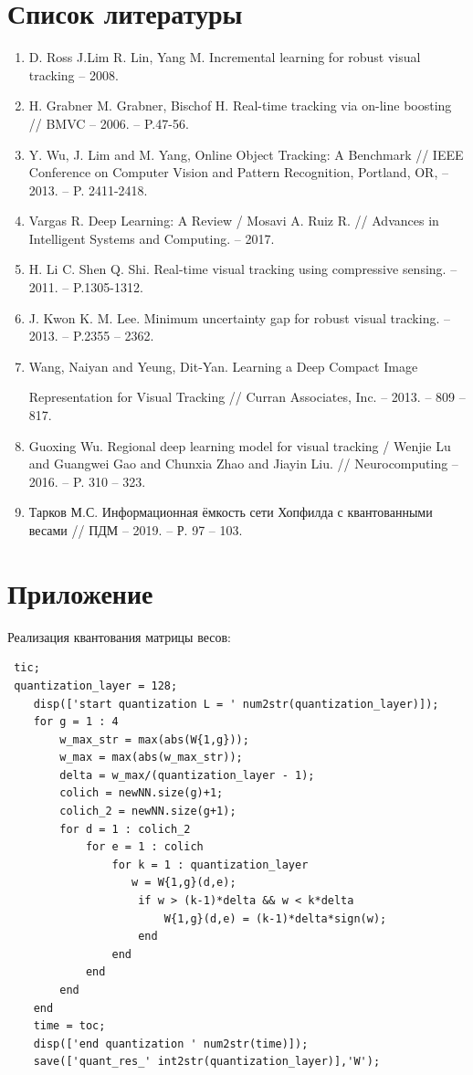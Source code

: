 \documentclass[14pt, a4paper]{article}
\begin{document}
\section*{Список литературы}
\begin{enumerate}[leftmargin=0em, itemindent=2.5 em,itemsep=1.5 pt,parsep=1.5 pt]
    \item D. Ross J.Lim R. Lin, Yang M. Incremental learning for robust visual tracking -- 2008.
    \item H. Grabner M. Grabner, Bischof H. Real-time tracking via on-line boosting // BMVC -- 2006. -- P.47-56.
    \item Y. Wu, J. Lim and M. Yang, Online Object Tracking: A Benchmark // IEEE Conference on Computer Vision and Pattern Recognition, Portland, OR, -- 2013. -- P. 2411-2418.
    \item Vargas R. Deep Learning: A Review / Mosavi A. Ruiz R. // Advances in Intelligent Systems and Computing. -- 2017.
    \item H. Li C. Shen Q. Shi. Real-time visual tracking using compressive sensing. -- 2011. -- P.1305-1312.
    \item J. Kwon K. M. Lee. Minimum uncertainty gap for robust visual tracking. -- 2013. -- P.2355 -- 2362.
    \item Wang, Naiyan and Yeung, Dit-Yan. Learning a Deep Compact Image
    
    Representation for Visual Tracking // Curran Associates, Inc. -- 2013. -- 809 -- 817.
    \item Guoxing Wu. Regional deep learning model for visual tracking /  Wenjie Lu and Guangwei Gao and Chunxia Zhao and Jiayin Liu. // Neurocomputing -- 2016. -- P. 310 -- 323.
    \item Тарков М.С. Информационная ёмкость сети Хопфилда с квантованными весами // ПДМ -- 2019. -- Р. 97 -- 103.
\end{enumerate}
\newpage
\section*{Приложение}
Реализация квантования матрицы весов:
\begin{verbatim}
 tic;
 quantization_layer = 128; 
    disp(['start quantization L = ' num2str(quantization_layer)]);
    for g = 1 : 4
        w_max_str = max(abs(W{1,g}));
        w_max = max(abs(w_max_str));
        delta = w_max/(quantization_layer - 1);
        colich = newNN.size(g)+1;
        colich_2 = newNN.size(g+1);
        for d = 1 : colich_2
            for e = 1 : colich
                for k = 1 : quantization_layer
                   w = W{1,g}(d,e);
                    if w > (k-1)*delta && w < k*delta
                        W{1,g}(d,e) = (k-1)*delta*sign(w);
                    end
                end
            end
        end
    end
    time = toc;
    disp(['end quantization ' num2str(time)]);
    save(['quant_res_' int2str(quantization_layer)],'W');
\end{verbatim}
\end{document}
